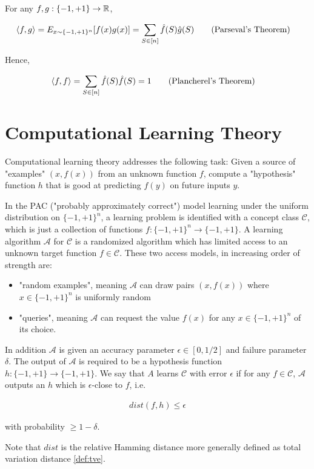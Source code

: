 \documentclass[main.tex]{subfiles}
\begin{document}
\begin{theorem}
For any $f, g: \{-1, +1\} \rightarrow \mathbb{R}$,

\begin{align}
\label{eq:parsev}
\langle f, g \rangle &= E_{x \sim \{-1, +1\}^n}[f(x)g(x)] = \sum_{S \in [n]} \hat{f}(S) \hat{g}(S)	 \tag{Parseval's Theorem}
\end{align}

Hence,

\begin{align*}
\langle f, f \rangle &= \sum_{S \in [n]} \hat{f}(S) \hat{f}(S) = 1	 \tag{Plancherel's Theorem}
\end{align*}
\end{theorem}

\section{Computational Learning Theory}

Computational learning theory addresses the following task: Given a source of "examples" $(x, f(x))$ from an unknown function $f$, compute a "hypothesis" function $h$ that is good at predicting $f(y)$ on future inputs $y$. 

\begin{definition}
In the PAC ("probably approximately correct") model learning under the uniform distribution on $\{-1, +1\}^n$, a learning problem is identified with a concept class $\mathcal{C}$, which is just a collection of functions $f: \{-1, +1\}^n \rightarrow \{-1, +1\}$. A learning algorithm $\mathcal{A}$ for $\mathcal{C}$ is a randomized algorithm which has limited access to an unknown target function $f \in \mathcal{C}$. These two access models, in increasing order of strength are:

\begin{itemize}
\item "random examples", meaning $\mathcal{A}$ can draw pairs $(x, f(x))$ where $x \in \{-1, +1\}^n$ is uniformly random
\item "queries", meaning $\mathcal{A}$ can request the value $f(x)$ for any $x \in \{-1, +1\}^n$ of its choice. 
\end{itemize}

In addition $\mathcal{A}$ is given an accuracy parameter $\epsilon \in [0, 1/2]$ and failure parameter $\delta$. The output of $\mathcal{A}$ is required to be a hypothesis function $h : \{-1, +1\} \rightarrow \{ -1, +1 \}$. We say that $A$ learns $\mathcal{C}$ with error $\epsilon$ if for any $f \in \mathcal{C}$, $\mathcal{A}$ outputs an $h$ which is $\epsilon$-close to $f$, i.e.

\begin{align*}
dist(f, h) \leq \epsilon	
\end{align*}

with probability $\geq 1 - \delta$. 

Note that $dist$ is the relative Hamming distance more generally defined as total variation distance \ref{def:tve}. 
\end{definition}
\end{document}
